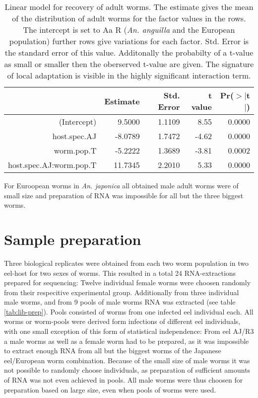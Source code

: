 \begin{table}[ht]
\begin{center}
\begin{tabular}{rrrrr}
  \hline
 & Estimate & Std. Error & t value & Pr($>$$|$t$|$) \\ 
  \hline
  (Intercept) & 9.5000 & 1.1109 & 8.55 & 0.0000 \\ 
  host.spec.AJ & -8.0789 & 1.7472 & -4.62 & 0.0000 \\ 
  worm.pop.T & -5.2222 & 1.3689 & -3.81 & 0.0002 \\ 
  host.spec.AJ:worm.pop.T & 11.7345 & 2.2010 & 5.33 & 0.0000 \\ 
   \hline
\end{tabular}
\caption[Linear model for recovery]{Linear model for recovery of adult
  worms. The estimate gives the mean of the distribution of adult
  worms for the factor values in the rows. The intercept is set to Aa
  R (\textit{An. anguilla} and the European population) further rows
  give variations for each factor. Std. Error is the standard error of
  this value. Additonally the probabilty of a t-value as small or
  smaller then the oberserved t-value are given. The signature of
  local adaptation is visible in the highly significant interaction
  term.}
\label{tab:ad-sig}
\end{center}
\end{table}

For Euroopean worms in \textit{An. japonica} all obtained male adult
worms were of small size and preparation of RNA was impossible for all
but the three biggest worms.

\section{Sample preparation}

Three biological replicates were obtained from each two worm
population in two eel-host for two sexes of worms. This resulted in a
total 24 RNA-extractions prepared for sequencing: Twelve individual
female worms were choosen randomly from their respecitive experimental
group. Additionally from three individual male worms, and from 9 pools
of male worms RNA was extracted (see table \ref{tab:lib-prep}). Pools
consisted of worms from one infected eel individual each. All worms or
worm-pools were derived form infections of different eel individuals,
with one small exception of this form of statistical independence:
From eel AJ/R3 a male worms as well as a female worm had to be
prepared, as it was impossible to extract enough RNA from all but the
biggest worms of the Japanese eel/European worm combination. Because
of the small size of male worms it was not possible to randomly choose
individuals, as preparation of sufficient amounts of RNA was not even
achieved in pools. All male worms were thus choosen for preparation
based on large size, even when pools of worms were used.

